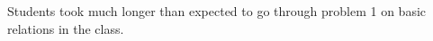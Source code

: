 \documentclass[handout]{mcs}
\begin{document}


\begin{staffnotes}

Students took much longer than expected to go through problem 1 on basic relations in the class.

\end{staffnotes}








\iffalse
\instatements{\newpage}
\end{document}
